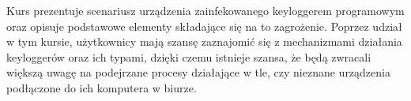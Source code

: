 \documentclass[12pt,twoside]{article}
\begin{document}
Kurs prezentuje scenariusz urządzenia zainfekowanego keyloggerem programowym oraz opisuje podstawowe elementy składające się na to zagrożenie. Poprzez udział w tym kursie, użytkownicy mają szansę zaznajomić się z mechanizmami działania keyloggerów oraz ich typami, dzięki czemu istnieje szansa, że będą zwracali większą uwagę na podejrzane procesy działające w tle, czy nieznane urządzenia podłączone do ich komputera w biurze.

\clearpage
\end{document}
